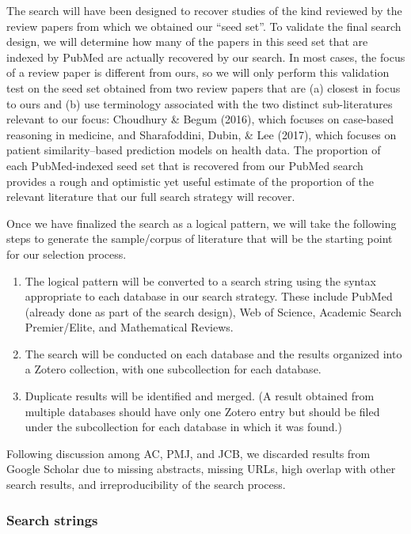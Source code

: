 \documentclass{article}
\providecommand{\tightlist}{%
  \setlength{\itemsep}{0pt}\setlength{\parskip}{0pt}}
\begin{document}
The search will have been designed to recover studies of the kind
reviewed by the review papers from which we obtained our ``seed set''.
To validate the final search design, we will determine how many of the
papers in this seed set that are indexed by PubMed are actually
recovered by our search. In most cases, the focus of a review paper is
different from ours, so we will only perform this validation test on the
seed set obtained from two review papers that are (a) closest in focus
to ours and (b) use terminology associated with the two distinct
sub-literatures relevant to our focus: Choudhury \& Begum (2016), which
focuses on case-based reasoning in medicine, and Sharafoddini, Dubin, \&
Lee (2017), which focuses on patient similarity--based prediction models
on health data. The proportion of each PubMed-indexed seed set that is
recovered from our PubMed search provides a rough and optimistic yet
useful estimate of the proportion of the relevant literature that our
full search strategy will recover.

Once we have finalized the search as a logical pattern, we will take the
following steps to generate the sample/corpus of literature that will be
the starting point for our selection process.

\begin{enumerate}
\def\labelenumi{\arabic{enumi}.}
\tightlist
\item
  The logical pattern will be converted to a search string using the
  syntax appropriate to each database in our search strategy. These
  include PubMed (already done as part of the search design), Web of
  Science, Academic Search Premier/Elite, and Mathematical Reviews.
\item
  The search will be conducted on each database and the results
  organized into a Zotero collection, with one subcollection for each
  database.
\item
  Duplicate results will be identified and merged. (A result obtained
  from multiple databases should have only one Zotero entry but should
  be filed under the subcollection for each database in which it was
  found.)
\end{enumerate}

Following discussion among AC, PMJ, and JCB, we discarded results from
Google Scholar due to missing abstracts, missing URLs, high overlap with
other search results, and irreproducibility of the search process.

\hypertarget{search-strings}{%
\subsubsection*{Search strings}\label{search-strings}}
\end{document}
